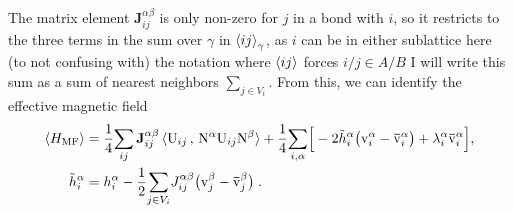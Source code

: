 The matrix element $\mathbf{J}_{ij}^{\alpha\beta}$ is only non-zero for $j$ in a bond with $i$, so it restricts to the three terms in the sum over $\gamma$ in $\braket{ij}_\gamma$, as  $i$ can be in either sublattice here (to not confusing with) the notation where $\braket{ij}$ forces $i/j\in A/B$  I will write this sum as a sum of nearest neighbors $\sum_{j\in V_i}$.
From this, we can identify the effective magnetic field
\begin{align}
        \braket{H_{\mathrm{MF}}  }
     &=
   \frac{1}{4}\!\sum_{ij}\mathbf{J}_{ij}^{\alpha\beta}  \braket{ \rmU_{ij} \, , \,  \rmN^\alpha   \rmU_{ij} \rmN^\beta }     +\frac{1}{4}\!\sum_{i, \alpha}  \!\Big[ -2\tilde{h}_i^\alpha  \big( \mathrm{v}^\alpha_i - \bar{\mathrm{v}}^\alpha_i \big) + \lambda_i^\alpha \bar{\mathrm{v}}^\alpha_i \Big]  ,  \\
   \tilde{h}_i^\alpha &= h_i^\alpha - \frac{1}{2}
   \!\sum_{j \in V_i} \! J^{\alpha\beta}_{ij}  \big( \mathrm{v}^\beta_j- \bar{\mathrm{v}}^\beta_j\big)
   \; . \label{B:effective-field}
\end{align}



